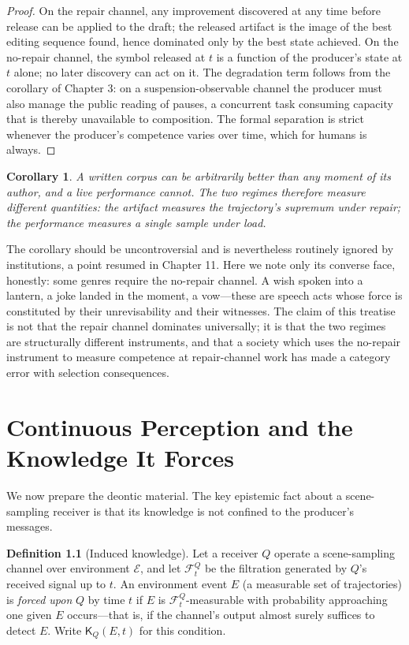 \documentclass[11pt,oneside]{book}
\theoremstyle{plain}
\newtheorem{corollary}[theorem]{Corollary}
\theoremstyle{definition}
\newtheorem{definition}[theorem]{Definition}
\theoremstyle{remark}
\newcommand{\Env}{\mathcal{E}}
\newcommand{\Know}{\mathsf{K}}
\begin{document}
\begin{proof}
On the repair channel, any improvement discovered at any time before release can be applied to the draft; the released artifact is the image of the best editing sequence found, hence dominated only by the best state achieved. On the no-repair channel, the symbol released at $t$ is a function of the producer's state at $t$ alone; no later discovery can act on it. The degradation term follows from the corollary of Chapter 3: on a suspension-observable channel the producer must also manage the public reading of pauses, a concurrent task consuming capacity that is thereby unavailable to composition. The formal separation is strict whenever the producer's competence varies over time, which for humans is always.
\end{proof}

\begin{corollary}
A written corpus can be arbitrarily better than any moment of its author, and a live performance cannot. The two regimes therefore measure different quantities: the artifact measures the trajectory's supremum under repair; the performance measures a single sample under load.
\end{corollary}

The corollary should be uncontroversial and is nevertheless routinely ignored by institutions, a point resumed in Chapter 11. Here we note only its converse face, honestly: some genres require the no-repair channel. A wish spoken into a lantern, a joke landed in the moment, a vow---these are speech acts whose force is constituted by their unrevisability and their witnesses. The claim of this treatise is not that the repair channel dominates universally; it is that the two regimes are structurally different instruments, and that a society which uses the no-repair instrument to measure competence at repair-channel work has made a category error with selection consequences.

\chapter{Continuous Perception and the Knowledge It Forces}

We now prepare the deontic material. The key epistemic fact about a scene-sampling receiver is that its knowledge is not confined to the producer's messages.

\begin{definition}[Induced knowledge]
Let a receiver $Q$ operate a scene-sampling channel over environment $\Env$, and let $\mathcal{F}^Q_t$ be the filtration generated by $Q$'s received signal up to $t$. An environment event $E$ (a measurable set of trajectories) is \emph{forced upon} $Q$ by time $t$ if $E$ is $\mathcal{F}^Q_t$-measurable with probability approaching one given $E$ occurs---that is, if the channel's output almost surely suffices to detect $E$. Write $\Know_Q(E, t)$ for this condition.
\end{definition}
\end{document}
